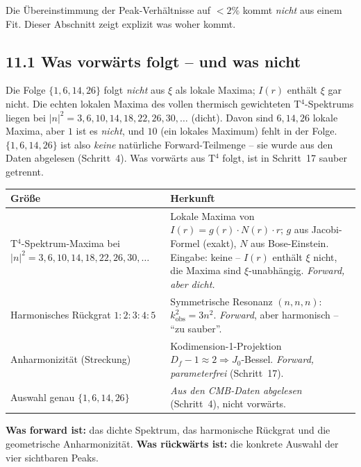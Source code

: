 Die Übereinstimmung der Peak-Verhältnisse auf $< 2\%$ kommt
\emph{nicht} aus einem Fit. Dieser Abschnitt zeigt explizit
was woher kommt.

\subsection*{11.1 Was vorwärts folgt -- und was nicht}

\begin{tcolorbox}[colback=red!4!white, colframe=red!55!black,
  title={Einordnung der Folge $\{1,6,14,26\}$}]
Die Folge $\{1,6,14,26\}$ folgt \emph{nicht} aus $\xi$ als lokale Maxima;
$I(r)$ enthält $\xi$ gar nicht. Die echten lokalen Maxima des vollen thermisch gewichteten T$^4$-Spektrums
liegen bei $|n|^2 = 3, 6, 10, 14, 18, 22, 26, 30, \ldots$ (dicht). Davon
sind $6,14,26$ lokale Maxima, aber $1$ ist es \emph{nicht}, und $10$
(ein lokales Maximum) fehlt in der Folge. $\{1,6,14,26\}$ ist also
\emph{keine} natürliche Forward-Teilmenge -- sie wurde aus den Daten
abgelesen (Schritt~4). Was vorwärts aus T$^4$ folgt, ist in Schritt~17
sauber getrennt.
\end{tcolorbox}

\begin{center}
\begin{tabular}{p{4cm}p{8cm}}
\toprule
\textbf{Größe} & \textbf{Herkunft} \\
\midrule
T$^4$-Spektrum-Maxima bei \newline $|n|^2 = 3,6,10,14,18,22,26,30,\ldots$ &
  Lokale Maxima von $I(r) = g(r)\cdot N(r)\cdot r$;
  $g$ aus Jacobi-Formel (exakt), $N$ aus Bose-Einstein.
  Eingabe: keine -- $I(r)$ enthält $\xi$ nicht, die Maxima sind $\xi$-unabhängig. \emph{Forward, aber dicht.} \\
\addlinespace
Harmonisches Rückgrat $1:2:3:4:5$ &
  Symmetrische Resonanz $(n,n,n)$: $k^2_\mathrm{obs}=3n^2$.
  \emph{Forward}, aber harmonisch -- ``zu sauber''. \\
\addlinespace
Anharmonizität (Streckung) &
  Kodimension-1-Projektion $D_f-1\approx2 \Rightarrow J_0$-Bessel.
  \emph{Forward, parameterfrei} (Schritt~17). \\
\addlinespace
Auswahl genau $\{1,6,14,26\}$ &
  \emph{Aus den CMB-Daten abgelesen} (Schritt~4), nicht vorwärts. \\
\bottomrule
\end{tabular}
\end{center}

\textbf{Was forward ist:} das dichte Spektrum, das harmonische Rückgrat
und die geometrische Anharmonizität. \textbf{Was rückwärts ist:} die
konkrete Auswahl der vier sichtbaren Peaks.

